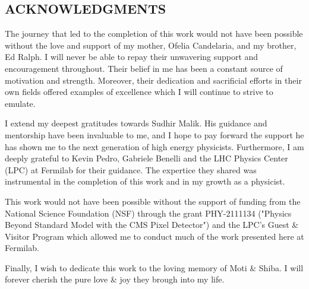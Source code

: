 


\vspace*{2in}
\begin{center}
\emph{\blindtext} %
\end{center}

\newpage


\vspace*{0.5in}
\begin{center}
\section*{ACKNOWLEDGMENTS}
\end{center}



\noindent The journey that led to the completion of this work would not have been possible without the love and support of my mother, Ofelia Candelaria, and my brother, Ed Ralph. I will never be able to repay their unwavering support and encouragement throughout. Their belief in me has been a constant source of motivation and strength. Moreover, their dedication and sacrificial efforts in their own fields offered examples of excellence which I will continue to strive to emulate. 

I extend my deepest gratitudes towards Sudhir Malik. His guidance and mentorship have been invaluable to me, and I hope to pay forward the support he has shown me to the next generation of high energy physicists. Furthermore, I am deeply grateful to Kevin Pedro, Gabriele Benelli and the LHC Physics Center (LPC) at Fermilab for their guidance. The expertice they shared was instrumental in the completion of this work and in my growth as a physicist. 

This work would not have been possible without the support of funding from the National Science Foundation (NSF) through the grant PHY-2111134 ("Physics Beyond Standard Model with the CMS Pixel Detector") and the LPC's Guest \& Visitor Program which allowed me to conduct much of the work presented here at Fermilab. 

Finally, I wish to dedicate this work to the loving memory of Moti \& Shiba. I will forever cherish the pure love \& joy they brough into my life.




